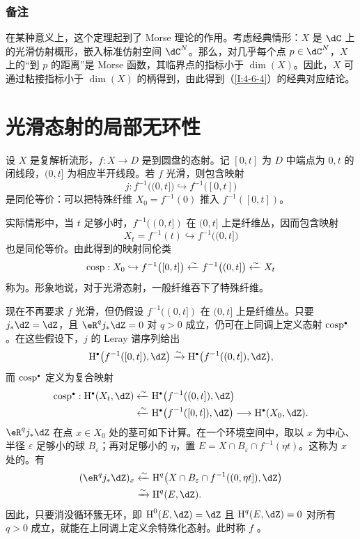 \subsubsection{备注}\label{I:4-6-5}
在某种意义上，这个定理起到了 Morse 理论的作用。考虑经典情形：$X$ 是 $\dC$ 上的光滑仿射概形，嵌入标准仿射空间 $\dC^N$。那么，对几乎每个点 $p\in\dC^N$，$X$ 上的“到 $p$ 的距离”是 Morse 函数，其临界点的指标小于 $\dim(X)$。因此，$X$ 可通过粘接指标小于 $\dim(X)$ 的柄得到，由此得到（\ref{I:4-6-4}）的经典对应结论。

\section{光滑态射的局部无环性}\label{I:5}
设 $X$ 是复解析流形，$f:X\to D$ 是到圆盘的态射。记 $[0,t]$ 为 $D$ 中端点为 $0,t$ 的闭线段，$(0,t]$ 为相应半开线段。若 $f$ 光滑，则包含映射
\[
j:f^{-1}\bigl((0,t]\bigr)\hookrightarrow f^{-1}\bigl([0,t]\bigr)
\]
是同伦等价：可以把特殊纤维 $X_0=f^{-1}(0)$ 推入 $f^{-1}([0,t])$。

实际情形中，当 $t$ 足够小时，$f^{-1}((0,t])$ 在 $(0,t]$ 上是纤维丛，因而包含映射
\[
X_t=f^{-1}(t)\hookrightarrow f^{-1}\bigl((0,t]\bigr)
\]
也是同伦等价。由此得到的映射同伦类
\[
\operatorname{cosp}:X_0\hookrightarrow f^{-1}\bigl([0,t]\bigr)
\xleftarrow\sim f^{-1}\bigl((0,t]\bigr)\xleftarrow\sim X_t
\]
称为。形象地说，对于光滑态射，一般纤维吞下了特殊纤维。

现在不再要求 $f$ 光滑，但仍假设 $f^{-1}((0,t])$ 在 $(0,t]$ 上是纤维丛。只要 $j_*\dZ=\dZ$，且 $\eR^qj_*\dZ=0$ 对 $q>0$ 成立，仍可在上同调上定义态射 $\cosp^\bullet$。在这些假设下，$j$ 的 Leray 谱序列给出
\[
\h^\bullet\bigl(f^{-1}([0,t]),\dZ\bigr)
\iso\h^\bullet\bigl(f^{-1}((0,t]),\dZ\bigr),
\]
而 $\cosp^\bullet$ 定义为复合映射
\[
\begin{aligned}
\cosp^\bullet:\h^\bullet(X_t,\dZ)
&\xleftarrow\sim\h^\bullet\bigl(f^{-1}((0,t]),\dZ\bigr)\\
&\xleftarrow\sim\h^\bullet\bigl(f^{-1}([0,t]),\dZ\bigr)
\longrightarrow\h^\bullet(X_0,\dZ).
\end{aligned}
\]
$\eR^qj_*\dZ$ 在点 $x\in X_0$ 处的茎可如下计算。在一个环境空间中，取以 $x$ 为中心、半径 $\varepsilon$ 足够小的球 $B_\varepsilon$；再对足够小的 $\eta$，置 $E=X\cap B_\varepsilon\cap f^{-1}(\eta t)$。这称为 $x$ 处的。有
\[
\begin{aligned}
(\eR^qj_*\dZ)_x
&\xleftarrow\sim\h^q\bigl(X\cap B_\varepsilon\cap f^{-1}((0,\eta t]),\dZ\bigr)\\
&\xrightarrow\sim\h^q(E,\dZ).
\end{aligned}
\]
因此，只要消没循环簇无环，即 $\h^0(E,\dZ)=\dZ$ 且 $\h^q(E,\dZ)=0$ 对所有 $q>0$ 成立，就能在上同调上定义余特殊化态射。此时称 $f$ 。

